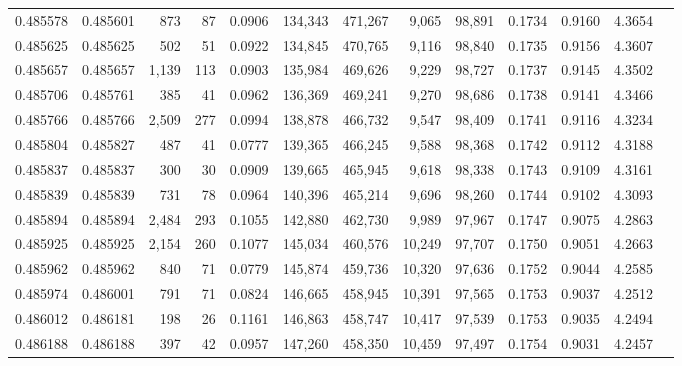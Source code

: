 \begin{tabular}{rrrrrrrrrrrrr}
0.485578 & 0.485601 &   873 &    87 &                                     0.0906 & 134,343 & 471,267 &   9,065 &  98,891 & 0.1734 & 0.9160 & 4.3654 \\
0.485625 & 0.485625 &   502 &    51 &                                     0.0922 & 134,845 & 470,765 &   9,116 &  98,840 & 0.1735 & 0.9156 & 4.3607 \\
0.485657 & 0.485657 & 1,139 &   113 &                                     0.0903 & 135,984 & 469,626 &   9,229 &  98,727 & 0.1737 & 0.9145 & 4.3502 \\
0.485706 & 0.485761 &   385 &    41 &                                     0.0962 & 136,369 & 469,241 &   9,270 &  98,686 & 0.1738 & 0.9141 & 4.3466 \\
0.485766 & 0.485766 & 2,509 &   277 &                                     0.0994 & 138,878 & 466,732 &   9,547 &  98,409 & 0.1741 & 0.9116 & 4.3234 \\
0.485804 & 0.485827 &   487 &    41 &                                     0.0777 & 139,365 & 466,245 &   9,588 &  98,368 & 0.1742 & 0.9112 & 4.3188 \\
0.485837 & 0.485837 &   300 &    30 &                                     0.0909 & 139,665 & 465,945 &   9,618 &  98,338 & 0.1743 & 0.9109 & 4.3161 \\
0.485839 & 0.485839 &   731 &    78 &                                     0.0964 & 140,396 & 465,214 &   9,696 &  98,260 & 0.1744 & 0.9102 & 4.3093 \\
0.485894 & 0.485894 & 2,484 &   293 &                                     0.1055 & 142,880 & 462,730 &   9,989 &  97,967 & 0.1747 & 0.9075 & 4.2863 \\
0.485925 & 0.485925 & 2,154 &   260 &                                     0.1077 & 145,034 & 460,576 &  10,249 &  97,707 & 0.1750 & 0.9051 & 4.2663 \\
0.485962 & 0.485962 &   840 &    71 &                                     0.0779 & 145,874 & 459,736 &  10,320 &  97,636 & 0.1752 & 0.9044 & 4.2585 \\
0.485974 & 0.486001 &   791 &    71 &                                     0.0824 & 146,665 & 458,945 &  10,391 &  97,565 & 0.1753 & 0.9037 & 4.2512 \\
0.486012 & 0.486181 &   198 &    26 &                                     0.1161 & 146,863 & 458,747 &  10,417 &  97,539 & 0.1753 & 0.9035 & 4.2494 \\
0.486188 & 0.486188 &   397 &    42 &                                     0.0957 & 147,260 & 458,350 &  10,459 &  97,497 & 0.1754 & 0.9031 & 4.2457 \\

\end{tabular}
